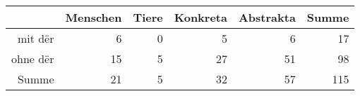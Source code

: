 \begin{tabular}{rrrrrr}
  \hline
 & Menschen & Tiere & Konkreta & Abstrakta & Summe \\ 
  \hline
mit dër & 6 & 0 & 5 & 6 & 17 \\ 
  ohne dër & 15 & 5 & 27 & 51 & 98 \\ 
  Summe & 21 & 5 & 32 & 57 & 115 \\ 
   \hline
\end{tabular}
